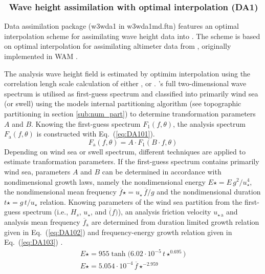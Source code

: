 \vssub
\subsubsection{~Wave height assimilation with optimal interpolation ({\code DA1})} \label{sub:da1}

\noindent
Data assimilation package ({\F w3wda1} in {\file w3wda1md.ftn}) features
an optimal interpolation scheme for assimilating wave height data
into {\ws}. The scheme is based on optimal interpolation for
assimilating altimeter data from \citet{art:LGJ92},
originally implemented in WAM \citep{bk:WAM94}.

The analysis wave height field is estimated by optimim interpolation using
the correlation lengh scale calculation of either \citet{art:VMH97}, or
\citet{GY2004}. {\ws}'s full two-dimensional wave spectrum is utilised as
first-guess spectrum and classified into primarily wind sea (or swell)
using the models internal partitioning algorithm (see topographic partitioning
in section \ref{sub:num_part}) to determine transformation parameters $A$ and $B$.
Knowing the first-guess spectrum $F_1(f,\theta)$, the analysis spectrum
$F_\mathrm{a}(f,\theta)$ is constructed with Eq.~(\ref{eq:DA101}).
\begin{equation}\label{eq:DA101}
F_\mathrm{a}(f,\theta) = A\cdot F_1(B\cdot f,\theta)
\end{equation}
Depending on wind sea or swell spectrum, different techniques are applied
to estimate tranformation parameters. If the first-guess spectrum contains
primarily wind sea, parameters $A$ and $B$ can be determined in accordance
with nondimensional growth laws, namely the nondimensional energy
 $E\star=E\,g^2/u_\star^4$, the nondimensional mean frequency
 $\overline{f}\star = u_\star\,\overline{f}/g$ and the nondimensional duration
 $t\star=g\,t/u_\star$ relation. Knowing parameters of the wind sea partition
from the first-guess spectrum (i.e., $H_s$, $u_\star$, and $\overline(f)$),
an analysis friction velocity $u_{\star\,\mathrm{a}}$
and analysis mean frequency $\overline{f}_\mathrm{a}$ are determined from
duration limited growth relation given in Eq.~(\ref{eq:DA102}) \citep{art:LGJ92}
and frequency-energy growth relation given in Eq.~(\ref{eq:DA103}) \citep{art:TGLDAS22}.
\begin{eqnarray}
E\star = 955 \tanh {\bigl ( 6.02\cdot 10^{-5}\,t\star^{0.695}\bigr )}\label{eq:DA102}\\
E\star = 5.054\cdot 10^{-4}\,\overline{f}\star^{-2.959}\label{eq:DA103}
\end{eqnarray}

